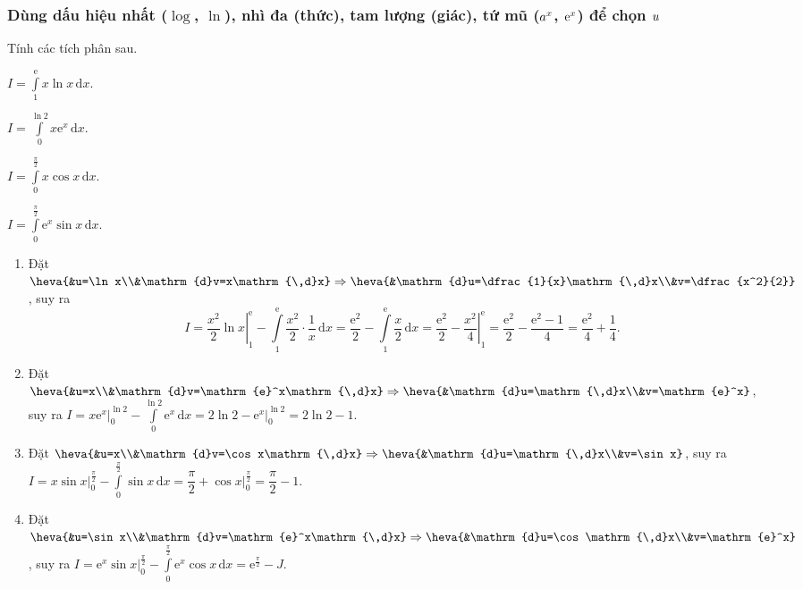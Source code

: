 \subsubsection{Dùng dấu hiệu nhất ($\log$, $\ln$), nhì đa (thức), tam lượng (giác), tứ mũ ($\lowercase{a^x}$, $\lowercase{\mathrm{e}^x}$) để chọn $\lowercase{u}$}
\begin{ex}%
	Tính các tích phân sau.
	\begin{listEX}[4]
		\item $\displaystyle I=\int\limits_{1}^{\mathrm{e}}x\ln x\mathrm{\,d}x$.
		\item $\displaystyle I=\int\limits_{0}^{\ln 2}x\mathrm{e}^x\mathrm{\,d}x$.
		\item $\displaystyle I=\int\limits_{0}^{\frac{\pi}{2}}x\cos x\mathrm{\,d}x$.
		\item $\displaystyle I=\int\limits_{0}^{\frac{\pi}{2}}\mathrm{e}^x\sin x\mathrm{\,d}x$.
	\end{listEX}
	\loigiai
	{
	\begin{enumerate}
		\item Đặt $\heva{&u=\ln x\\&\mathrm{d}v=x\mathrm{\,d}x}\Rightarrow\heva{&\mathrm{d}u=\dfrac{1}{x}\mathrm{\,d}x\\&v=\dfrac{x^2}{2}}$, suy ra
		\[I=\left.\dfrac{x^2}{2}\ln x\right|_{1}^{\mathrm{e}}-\int\limits_1^{\mathrm{e}}\dfrac{x^2}{2}\cdot\dfrac{1}{x}\mathrm{\,d}x=\dfrac{\mathrm{e}^2}{2}-\int\limits_1^{\mathrm{e}}\dfrac{x}{2}\mathrm{\,d}x=\dfrac{\mathrm{e}^2}{2}-\left.\dfrac{x^2}{4}\right|_{1}^{\mathrm{e}}=\dfrac{\mathrm{e}^2}{2}-\dfrac{\mathrm{e}^2-1}{4}=\dfrac{\mathrm{e}^2}{4}+\dfrac{1}{4}.\]
		\item Đặt $\heva{&u=x\\&\mathrm{d}v=\mathrm{e}^x\mathrm{\,d}x}\Rightarrow\heva{&\mathrm{d}u=\mathrm{\,d}x\\&v=\mathrm{e}^x}$, suy ra
		$\displaystyle I=\left.x\mathrm{e}^x\right|_{0}^{\ln2}-\int\limits_{0}^{\ln 2}\mathrm{e}^x\mathrm{\,d}x=2\ln 2-\left.\mathrm{e}^x\right|_0^{\ln2}=2\ln 2-1$.
		\item Đặt $\heva{&u=x\\&\mathrm{d}v=\cos x\mathrm{\,d}x}\Rightarrow\heva{&\mathrm{d}u=\mathrm{\,d}x\\&v=\sin x}$, suy ra $\displaystyle I=\left.x\sin x\right|_{0}^{\frac{\pi}{2}}-\int\limits_{0}^{\frac{\pi}{2}}\sin x\mathrm{\,d}x=\dfrac{\pi}{2}+\left.\cos x\right|_{0}^{\frac{\pi}{2}}=\dfrac{\pi}{2}-1$.
		\item Đặt $\heva{&u=\sin x\\&\mathrm{d}v=\mathrm{e}^x\mathrm{\,d}x}\Rightarrow\heva{&\mathrm{d}u=\cos\mathrm{\,d}x\\&v=\mathrm{e}^x}$, suy ra $\displaystyle I=\left.\mathrm{e}^x\sin x\right|_{0}^{\frac{\pi}{2}}-\int\limits_0^{\frac{\pi}{2}}\mathrm{e}^x\cos x\mathrm{\,d}x=\mathrm{e}^{\frac{\pi}{2}}-J$.\\

\end{enumerate}}
\end{ex}
